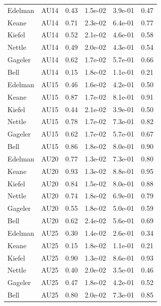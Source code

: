 \documentclass{monashthesis}
\begin{document}
\begin{table}[ht]
\begin{center}
\begin{tabular}{llllll}
Edelman & AU14 & 0.43 & 1.5e-02 & 3.9e-01 & 0.47 \\
Keane & AU14 & 0.71 & 2.3e-02 & 6.4e-01 & 0.77 \\
Kiefel & AU14 & 0.52 & 2.1e-02 & 4.6e-01 & 0.58 \\
Nettle & AU14 & 0.49 & 2.0e-02 & 4.3e-01 & 0.54 \\
Gageler & AU14 & 0.62 & 1.7e-02 & 5.7e-01 & 0.66 \\
Bell & AU14 & 0.15 & 1.8e-02 & 1.1e-01 & 0.21 \\
Edelman & AU15 & 0.46 & 1.6e-02 & 4.2e-01 & 0.50 \\
Keane & AU15 & 0.87 & 1.7e-02 & 8.1e-01 & 0.91 \\
Kiefel & AU15 & 0.44 & 2.1e-02 & 3.9e-01 & 0.50 \\
Nettle & AU15 & 0.78 & 1.7e-02 & 7.3e-01 & 0.82 \\
Gageler & AU15 & 0.62 & 1.7e-02 & 5.7e-01 & 0.67 \\
Bell & AU15 & 0.86 & 1.8e-02 & 8.0e-01 & 0.90 \\
Edelman & AU20 & 0.77 & 1.3e-02 & 7.3e-01 & 0.80 \\
Keane & AU20 & 0.93 & 1.3e-02 & 8.8e-01 & 0.95 \\
Kiefel & AU20 & 0.84 & 1.5e-02 & 8.0e-01 & 0.88 \\
Nettle & AU20 & 0.74 & 1.8e-02 & 6.9e-01 & 0.79 \\
Gageler & AU20 & 0.55 & 1.8e-02 & 5.0e-01 & 0.59 \\
Bell & AU20 & 0.62 & 2.4e-02 & 5.6e-01 & 0.69 \\
Edelman & AU25 & 0.30 & 1.4e-02 & 2.6e-01 & 0.34 \\
Keane & AU25 & 0.15 & 1.8e-02 & 1.1e-01 & 0.21 \\
Kiefel & AU25 & 0.90 & 1.3e-02 & 8.6e-01 & 0.93 \\
Nettle & AU25 & 0.40 & 2.0e-02 & 3.5e-01 & 0.46 \\
Gageler & AU25 & 0.47 & 1.8e-02 & 4.2e-01 & 0.52 \\
Bell & AU25 & 0.80 & 2.0e-02 & 7.3e-01 & 0.85 \\
\bottomrule
\end{tabular}
\end{center}
\end{table}
\end{document}

